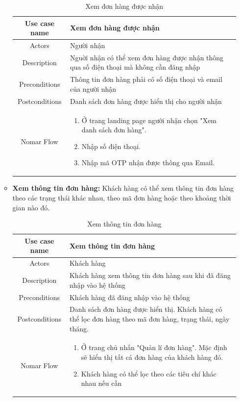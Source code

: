\begin{itemize}
\begin{itemize}
			
			\begin{table}[!htp]
				\centering\begin{tabular}{|c|m{25em}|}
					\hline 
					Use case name & Xem đơn hàng được nhận\\ 
					\hline 
					Actors & Người nhận \\ 
					\hline
					Description & Nguời nhận có thể xem đơn hàng được nhận thông qua số điện thoại mà không cần đăng nhập \\
					\hline 
					Preconditions & Thông tin đơn hàng phải có số điện thoại và email của người nhận \\
					\hline
					Postconditions & Danh sách đơn hàng được hiển thị cho người nhận \\
					\hline
					Nomar Flow & \begin{enumerate}
						\item Ở trang landing page người nhận chọn "Xem danh sách đơn hàng".
						\item Nhập số điện thoại.
						\item Nhập mã OTP nhận được thông qua Email.
					\end{enumerate}
					\\
					\hline
				\end{tabular}
				\caption{Xem đơn hàng được nhận}
			\end{table}
		
		
		\item \textbf{Xem thông tin đơn hàng:} Khách hàng có thể xem thông tin đơn hàng theo các trạng thái khác nhau, theo mã đơn hàng hoặc theo khoảng thời gian nào đó.
			
			\begin{table}[!htp]
				\centering\begin{tabular}{|c|m{25em}|}
					\hline 
					Use case name & Xem thông tin đơn hàng\\ 
					\hline 
					Actors & Khách hàng \\ 
					\hline
					Description & Khách hàng xem thông tin đơn hàng sau khi đã đăng nhập vào hệ thống \\
					\hline 
					Preconditions & Khách hàng đã đăng nhập vào hệ thống \\
					\hline
					Postconditions & Danh sách đơn hàng được hiển thị. Khách hàng có thể lọc đơn hàng theo mã đơn hàng, trạng thái, ngày tháng. \\
					\hline
					Nomar Flow & \begin{enumerate}
						\item Ở trang chủ nhấn "Quản lí đơn hàng". Mặc định sẽ hiển thị tất cả đơn hàng của khách hàng đó.
						\item Khách hàng có thể lọc theo các tiêu chí khác nhau nếu cần
					\end{enumerate}
					\\
					\hline
				\end{tabular}
				\caption{Xem thông tin đơn hàng}
			\end{table}
			

\end{itemize}
\end{itemize}
